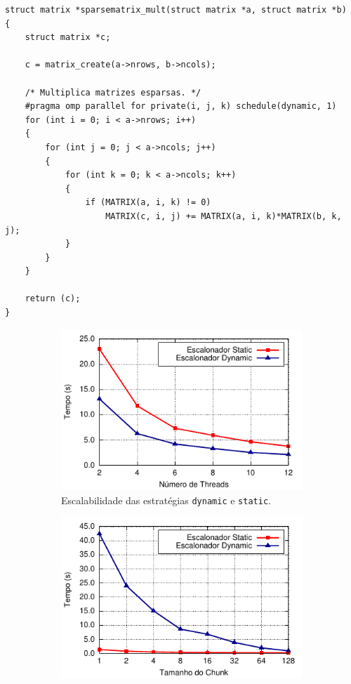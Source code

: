 \documentclass{SBCbookchapter}
\begin{document}
\begin{lstlisting}[frame=single, caption=Exemplo de multiplicação de matrizes esparsas.,
label=listing:sparsematrixmult]
struct matrix *sparsematrix_mult(struct matrix *a, struct matrix *b)
{
	struct matrix *c;

	c = matrix_create(a->nrows, b->ncols);

	/* Multiplica matrizes esparsas. */
	#pragma omp parallel for private(i, j, k) schedule(dynamic, 1)
	for (int i = 0; i < a->nrows; i++)
	{
		for (int j = 0; j < a->ncols; j++)
		{
			for (int k = 0; k < a->ncols; k++)
			{
				if (MATRIX(a, i, k) != 0)
					MATRIX(c, i, j) += MATRIX(a, i, k)*MATRIX(b, k, j);
			}
		}
	}

	return (c);
}
\end{lstlisting}

		\begin{figure}[t]
			\captionsetup[subfigure]{justification=centering}
			\centering
				\begin{subfigure}{0.47\linewidth}
					\includegraphics[width=\linewidth]{img/smm}
					\caption{Escalabilidade das estratégias \texttt{dynamic} e \texttt{static}.}
					\label{fig:static-dynamic-guided}
				\end{subfigure}
				\quad
				\begin{subfigure}{0.47\linewidth}
					\includegraphics[width=\linewidth]{img/chunk-size}

\end{subfigure}
\end{figure}
\end{document}
